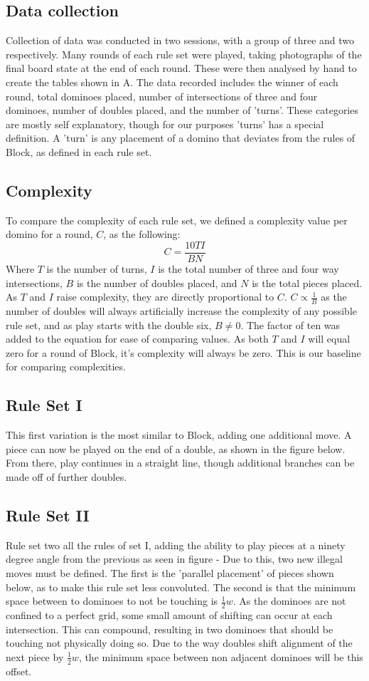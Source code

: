 \documentclass{article}
\begin{document}
\subsection{Data collection}
Collection of data was conducted in two sessions, with a group of three and two respectively. Many rounds of each rule set were played, taking photographs of the final board state at the end of each round. These were then analysed by hand to create the tables shown in A. The data recorded includes the winner of each round, total dominoes placed, number of intersections of three and four dominoes, number of doubles placed, and the number of 'turns'. These categories are mostly self explanatory, though for our purposes 'turns' has a special definition. A 'turn' is any placement of a domino that deviates from the rules of Block, as defined in each rule set.
\subsection{Complexity}
To compare the complexity of each rule set, we defined a complexity value per domino for a round, \(C\), as the following:
\begin{equation}\label{Eqn1}
    C=\frac{10TI}{BN}
\end{equation}
Where \(T\) is the number of turns, \(I\) is the total number of three and four way intersections, \(B\) is the number of doubles placed, and \(N\) is the total pieces placed. As \(T\) and \(I\) raise complexity, they are directly proportional to \(C\). \(C\propto\frac{1}{B}\) as the number of doubles will always artificially increase the complexity of any possible rule set, and as play starts with the double six, \(B\neq0\). The factor of ten was added to the equation for ease of comparing values. As both \(T\) and \(I\) will equal zero for a round of Block, it's complexity will always be zero. This is our baseline for comparing complexities. 
\subsection{Rule Set I}
This first variation is the most similar to Block, adding one additional move. A piece can now be played on the end of a double, as shown in the figure below. %
From there, play continues in a straight line, though additional branches can be made off of further doubles.
\subsection{Rule Set II}
Rule set two all the rules of set I, adding the ability to play pieces at a ninety degree angle from the previous as seen in figure - %
Due to this, two new illegal moves must be defined. The first is the 'parallel placement' of pieces shown below, as to make this rule set less convoluted. The second is that the minimum space between to dominoes to not be touching is \(\frac{1}{2}w\). As the dominoes are not confined to a perfect grid, some small amount of shifting can occur at each intersection. This can compound, resulting in two dominoes that should be touching not physically doing so. Due to the way doubles shift alignment of the next piece by \(\frac{1}{2}w\), the minimum space between non adjacent dominoes will be this offset.
\end{document}
